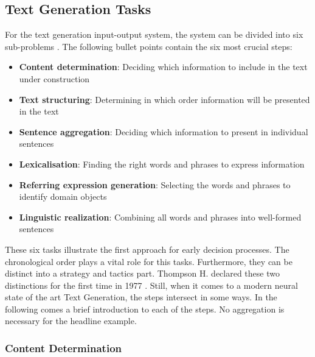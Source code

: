 \subsection{Text Generation Tasks}

For the text generation input-output system, the system can be divided into six sub-problems \cite{reiter}. The following bullet points contain the six most crucial steps:

\begin{itemize}
	\item \textbf{Content determination}: Deciding which information to include in the text under construction
	\item \textbf{Text structuring}: Determining in which order information will be presented in the text
	\item \textbf{Sentence aggregation}: Deciding which information to present in individual sentences
	\item \textbf{Lexicalisation}: Finding the right words and phrases to express information
	\item \textbf{Referring expression generation}: Selecting the words and phrases to identify domain objects
	\item \textbf{Linguistic realization}: Combining all words and phrases into well-formed sentences
\end{itemize}

These six tasks illustrate the first approach for early decision processes. 
The chronological order plays a vital role for this tasks. Furthermore, they can be distinct into a strategy and tactics part.
Thompson H. declared these two distinctions for the first time in 1977 \cite{thompson}. Still, when it comes to a modern neural state of the art Text Generation, the steps intersect in some ways. In the following comes a brief introduction to each of the steps. No aggregation is necessary for the headline example.

\subsubsection{Content Determination}\label{ss:content}

